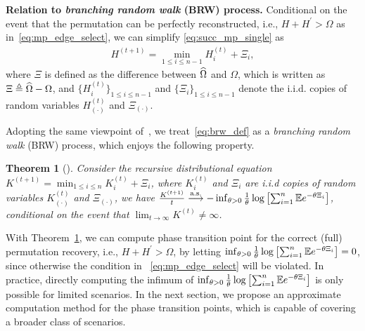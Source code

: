\documentclass[11pt]{article}
\newtheorem{theorem}{Theorem}
\begin{document}
\vspace{0.1in}
\noindent
\textbf{Relation to \emph{branching random walk} (BRW) process.}
Conditional on the event  that the permutation
can be perfectly reconstructed, i.e.,
$H + H^{'} > \Omega$ as in~\eqref{eq:mp_edge_select}, we can simplify \eqref{eq:succ_mp_single} as
\begin{align}
\label{eq:brw_def}
H^{(t+1)} = \min_{1\leq i \leq n-1} H_i^{(t)} + \Xi_i,
\end{align}
where  $\Xi$ is defined as the difference between
$\widehat{\Omega}$ and $\Omega$, which is written as
$\Xi\triangleq \widehat{\Omega} - \Omega$,
and $\{H_i^{(t)}\}_{1\leq i \leq n-1}$ and $\{\Xi_i\}_{1\leq i \leq n-1}$ denote the
 i.i.d. copies of random variables $H^{(t)}_{(\cdot)}$ and
$\Xi_{(\cdot)}$.

Adopting the same viewpoint
of~\citet{semerjian2020recovery}, we treat~\eqref{eq:brw_def} as a
\emph{branching random walk} (BRW) process,
which enjoys the following property.

\vspace{0.1in}
\begin{theorem}[\citet{hammersley1974postulates, kingman1975first, semerjian2020recovery}]
\label{thm:brw}
Consider the \emph{recursive distributional equation}
$K^{(t+1)} = \min_{1\leq i\leq n} K_i^{(t)} + \Xi_i$, where
$K_i^{(t)}$ and $\Xi_i$ are i.i.d copies
of random variables $K_{(\cdot)}^{(t)}$ and $\Xi_{(\cdot)}$,
we have $\frac{K^{(t+1)}}{t}  \stackrel{\textup{a.s.}}{\longrightarrow} -
\inf_{\theta > 0} \frac{1}{\theta}
\log\left[\sum_{i=1}^n \mathbb{E} e^{-\theta \Xi_i}\right]$,
conditional on the event that  $\lim_{t\rightarrow \infty}K^{(t)}\neq \infty$.
\end{theorem}

\newpage


With Theorem~\ref{thm:brw}, we can compute phase transition point
for the correct (full) permutation recovery, i.e.,
$H + H^{'} > \Omega$, by letting
$\inf_{\theta > 0} \frac{1}{\theta}
\log\left[\sum_{i=1}^n \mathbb{E} e^{-\theta \Xi_i}\right]= 0$,
since otherwise the condition in ~\eqref{eq:mp_edge_select} will be violated.
In practice, directly computing the infimum
of $\inf_{\theta > 0} \frac{1}{\theta}
\log\left[\sum_{i=1}^n \mathbb{E} e^{-\theta \Xi_i}\right]$
is only possible for limited scenarios.
In the next section, we propose
an approximate computation method for the phase transition points,
which is capable of covering a broader class of scenarios.
\end{document}
